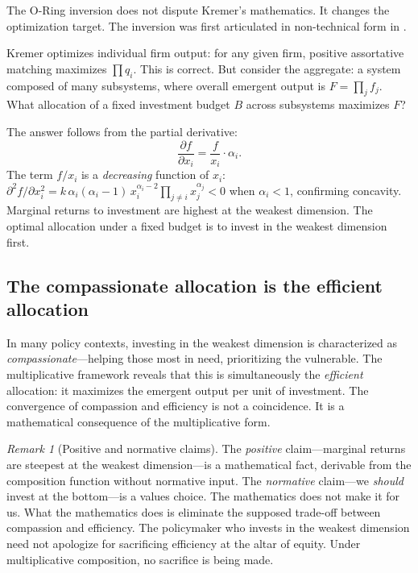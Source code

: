 \documentclass[12pt, a4paper]{article}
\theoremstyle{definition}
\theoremstyle{remark}
\newtheorem{remark}[theorem]{Remark}
\begin{document}
The O-Ring inversion does not dispute Kremer's mathematics. It changes the optimization target. The inversion was first articulated in non-technical form in \cite{kirsch2025}.

Kremer optimizes individual firm output: for any given firm, positive assortative matching maximizes $\prod q_i$. This is correct. But consider the aggregate: a system composed of many subsystems, where overall emergent output is $F = \prod_j f_j$. What allocation of a fixed investment budget $B$ across subsystems maximizes $F$?

The answer follows from the partial derivative:
\begin{equation}\label{eq:marginal}
\frac{\partial f}{\partial x_i} = \frac{f}{x_i} \cdot \alpha_i.
\end{equation}
The term $f / x_i$ is a \textit{decreasing} function of $x_i$: $\partial^2 f / \partial x_i^2 = k \, \alpha_i(\alpha_i - 1) \, x_i^{\alpha_i - 2} \prod_{j \neq i} x_j^{\alpha_j} < 0$ when $\alpha_i < 1$, confirming concavity. Marginal returns to investment are highest at the weakest dimension. The optimal allocation under a fixed budget is to invest in the weakest dimension first.

\subsection{The compassionate allocation is the efficient allocation}

In many policy contexts, investing in the weakest dimension is characterized as \textit{compassionate}---helping those most in need, prioritizing the vulnerable. The multiplicative framework reveals that this is simultaneously the \textit{efficient} allocation: it maximizes the emergent output per unit of investment. The convergence of compassion and efficiency is not a coincidence. It is a mathematical consequence of the multiplicative form.

\begin{remark}[Positive and normative claims]
The \textit{positive} claim---marginal returns are steepest at the weakest dimension---is a mathematical fact, derivable from the composition function without normative input. The \textit{normative} claim---we \textit{should} invest at the bottom---is a values choice. The mathematics does not make it for us. What the mathematics does is eliminate the supposed trade-off between compassion and efficiency. The policymaker who invests in the weakest dimension need not apologize for sacrificing efficiency at the altar of equity. Under multiplicative composition, no sacrifice is being made.
\end{remark}
\end{document}

